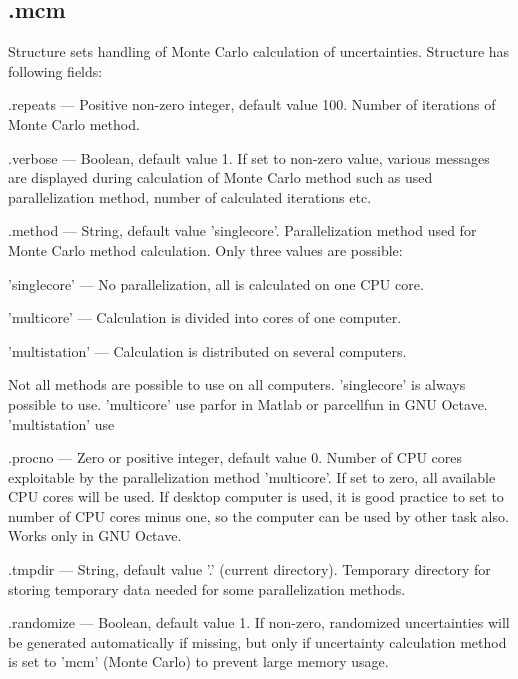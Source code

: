 \documentclass[12pt,a4paper,oneside]{report} %
\def\octave{{\sc GNU Octave}\xspace}
\begin{document}
\subsection{\textsf{.mcm}} %
\label{structcalcsetmcm}
Structure sets handling of Monte Carlo calculation of uncertainties. Structure has following fields:
\begin{tightdesc}
        \item [\textsf{.repeats}] ---  Positive non-zero integer, default value 100. Number of iterations of Monte Carlo method.

        \item [\textsf{.verbose}] ---  Boolean, default value 1. If set to non-zero value, various messages
        are displayed during calculation of Monte Carlo method such as used parallelization method,
        number of calculated iterations etc.

        \item [\textsf{.method}] ---  String, default value 'singlecore'. Parallelization method used for Monte
        Carlo method calculation. Only three values are possible:
        \begin{tightdesc}
                \item [\textsf{'singlecore'}] ---  No parallelization, all is calculated on one CPU core.
                \item [\textsf{'multicore'}] ---  Calculation is divided into cores of one computer.
                \item [\textsf{'multistation'}] ---  Calculation is distributed on several computers.
        \end{tightdesc}
        Not all methods are possible to use on all computers. 'singlecore' is always possible to
        use. 'multicore' use parfor in Matlab or parcellfun in GNU Octave. 'multistation' use %

        \item [\textsf{.procno}] ---  Zero or positive integer, default value 0. Number of CPU cores exploitable
        by the parallelization method \textsf{'multicore'}. If set to zero, all available CPU cores will be used. If
        desktop computer is used, it is good practice to set to number of CPU cores minus one, so
        the computer can be used by other task also. 
        Works only in \octave.

        \item [\textsf{.tmpdir}] ---  String, default value '.' (current directory). Temporary directory for
        storing temporary data needed for some parallelization methods. %

        \item [\textsf{.randomize}] ---  Boolean, default value 1. If non-zero, randomized uncertainties will be
        generated automatically if missing, but only if uncertainty calculation method is set to
        'mcm' (Monte Carlo) to prevent large memory usage.
\end{tightdesc}
\end{document}
